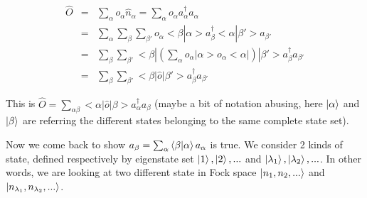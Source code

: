 \documentclass{article}
\begin{document}
\begin{eqnarray*}  \hat{O} & = & \underset{\alpha}{\sum} o_{\alpha} \hat{n}_{\alpha} =  \underset{\alpha}{\sum} o_{\alpha} a_{\alpha}^{\dag} a_{\alpha}\\  & = & \underset{\alpha}{\sum} \underset{\beta}{\sum}  \underset{\beta'}{\sum} o_{\alpha} < \beta | \alpha > a_{\beta}^{\dag} <  \alpha | \beta' > a_{\beta'}\\  & = & \underset{\beta}{\sum} \underset{\beta'}{\sum} < \beta |   \left( \underset{\alpha}{\sum} o_{\alpha} | \alpha > o_{\alpha} < \alpha |  \right) |  \beta' > a_{\beta}^{\dag} a_{\beta'}\\  & = & \underset{\beta}{\sum} \underset{\beta'}{\sum} < \beta |   \hat{o} |  \beta' > a_{\beta}^{\dag} a_{\beta'}\end{eqnarray*}

This is $\hat{O} = \underset{\alpha \beta}{\sum} < \alpha | \hat{o} | \beta > a_{\alpha}^{\dag}a_{\beta}$ (maybe a bit of notation abusing, here $\ket{\alpha}$ and $\ket{\beta}$ are referring the different states belonging to the same complete state set). 

Now we come back to show $a_{\beta} ={\sum}_\alpha \braket{\beta|\alpha} a_{\alpha}$ is true. We consider 2 kinds of state, defined respectively by eigenstate set $\ket{1},\ket{2},...$ and $\ket{\lambda_1}, \ket{\lambda_2},...$. In other words, we are looking at two different state in Fock space $\ket{n_1, n_2,...}$ and $\ket{n_{\lambda_1}, n_{\lambda_2},...}$.
\end{document}
